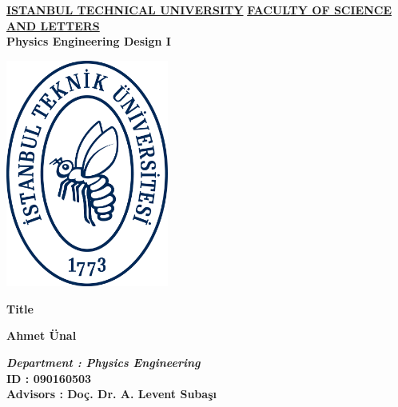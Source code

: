 ﻿\documentclass[12pt]{article}
\begin{document}
\begin{titlepage}
\begin{center}
\vspace*{1.5cm}\LARGE\textbf{\underline{ISTANBUL TECHNICAL UNIVERSITY}}\vspace*{0.6cm}
\Large\textbf{\underline{FACULTY OF SCIENCE AND LETTERS}}\vspace*{0.6cm}\\
\Large\textbf{Physics Engineering Design I}\vspace*{0.8cm}

\includegraphics[width=0.4\textwidth]{itu-istanbul-teknik_universitesi-logo.png}

\vspace{0.5cm}
\Large\textbf{Title}\vspace{0.5cm}

\large\textbf{Ahmet Ünal}\vspace{0.8cm}

\small\textbf{}

\end{center}
\begin{flushleft}
\textbf{\textit{Department \hspace*{1.7mm}: Physics Engineering}}\\ \vspace{0.4cm}
\textbf{ID \hspace{1.8cm}: 090160503}\\ \vspace{0.4cm}
\textbf{Advisors \hspace{0.85cm}: Doç. Dr. A. Levent Subaşı} \vspace{0.5cm}

\end{flushleft}



\end{titlepage}
\end{document}
